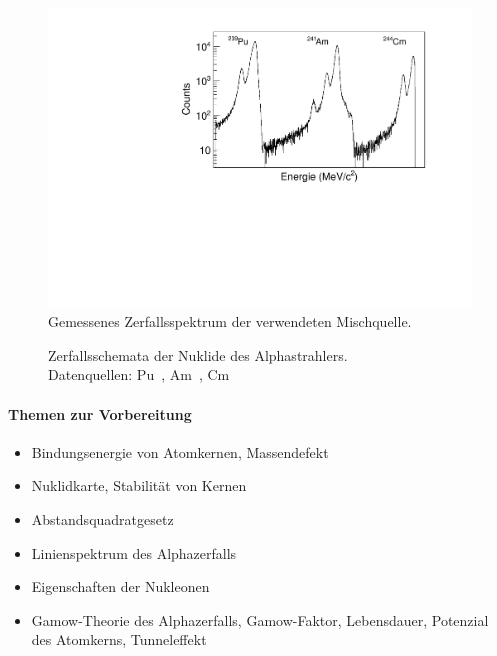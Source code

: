 \begin{figure}
	\begin{center}
		\includegraphics[width=0.9\linewidth]{img/Referenzmessung.pdf}
		\caption{Gemessenes Zerfallsspektrum der verwendeten Mischquelle.}
		\label{fig:spectrum}
	\end{center}
\end{figure}
%
\begin{figure}
	\begin{center}
		\caption{Zerfallsschemata der Nuklide des Alphastrahlers. \\Datenquellen: Pu~\cite{NDS2014}, Am~\cite{NDS2006}, Cm~\cite{NDS2008}}
		\label{fig:schemata}
	\end{center}
\end{figure}
%
\paragraph{Themen zur Vorbereitung}
\begin{itemize}
	\item Bindungsenergie von Atomkernen, Massendefekt
	\item Nuklidkarte, Stabilität von Kernen
	\item Abstandsquadratgesetz
	\item Linienspektrum des Alphazerfalls
	\item Eigenschaften der Nukleonen
	\item Gamow-Theorie des Alphazerfalls, Gamow-Faktor, Lebensdauer, Potenzial des Atomkerns, Tunneleffekt
\end{itemize}
\FloatBarrier
